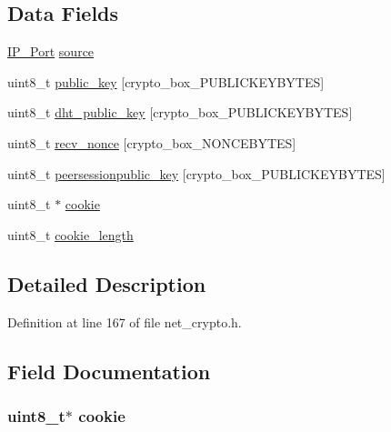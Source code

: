 \subsection*{Data Fields}
\begin{DoxyCompactItemize}
\item 
\hyperlink{struct_i_p___port}{I\+P\+\_\+\+Port} \hyperlink{struct_new___connection_afffde330c649378add9a507c9c151586}{source}
\item 
uint8\+\_\+t \hyperlink{struct_new___connection_aaa806bb1136fb3d4b5d8d8970b596ff7}{public\+\_\+key} \mbox{[}crypto\+\_\+box\+\_\+\+P\+U\+B\+L\+I\+C\+K\+E\+Y\+B\+Y\+T\+E\+S\mbox{]}
\item 
uint8\+\_\+t \hyperlink{struct_new___connection_ab2ecaa07625ad0ed5e07d3a1f0dcc939}{dht\+\_\+public\+\_\+key} \mbox{[}crypto\+\_\+box\+\_\+\+P\+U\+B\+L\+I\+C\+K\+E\+Y\+B\+Y\+T\+E\+S\mbox{]}
\item 
uint8\+\_\+t \hyperlink{struct_new___connection_aae0467706f97aa3ef23e5dc9c3c199d7}{recv\+\_\+nonce} \mbox{[}crypto\+\_\+box\+\_\+\+N\+O\+N\+C\+E\+B\+Y\+T\+E\+S\mbox{]}
\item 
uint8\+\_\+t \hyperlink{struct_new___connection_ac040d4ba2a22ee327952009e7396bb2f}{peersessionpublic\+\_\+key} \mbox{[}crypto\+\_\+box\+\_\+\+P\+U\+B\+L\+I\+C\+K\+E\+Y\+B\+Y\+T\+E\+S\mbox{]}
\item 
uint8\+\_\+t $\ast$ \hyperlink{struct_new___connection_a78fb2cbe7af4d12847f2f044c35e7823}{cookie}
\item 
uint8\+\_\+t \hyperlink{struct_new___connection_a801672aeddedd60f76a667a2275a95ce}{cookie\+\_\+length}
\end{DoxyCompactItemize}


\subsection{Detailed Description}


Definition at line 167 of file net\+\_\+crypto.\+h.



\subsection{Field Documentation}
\hypertarget{struct_new___connection_a78fb2cbe7af4d12847f2f044c35e7823}{
\subsubsection[{cookie}]{\setlength{\rightskip}{0pt plus 5cm}uint8\+\_\+t$\ast$ cookie}}\label{struct_new___connection_a78fb2cbe7af4d12847f2f044c35e7823}


